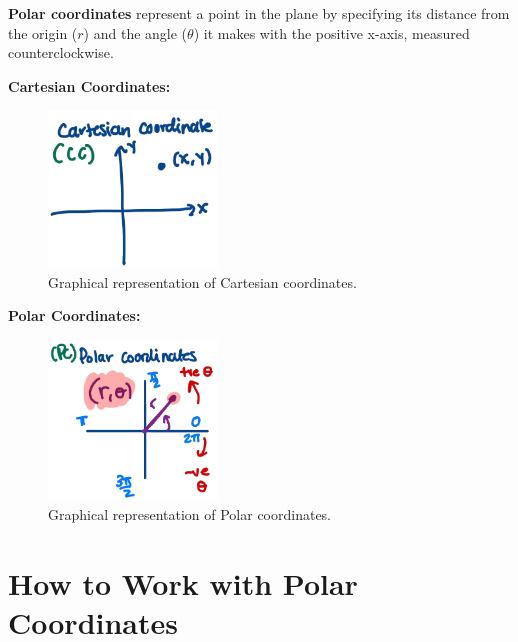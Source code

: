 \documentclass{article}
\begin{document}
\begin{definitionbox}
\textbf{Polar coordinates} represent a point in the plane by specifying its distance from the origin (\( r \)) and the angle (\( \theta \)) it makes with the positive x-axis, measured counterclockwise.

\vspace{0.5em}

\begin{conceptbox}
    \textbf{Cartesian Coordinates:}
    \begin{figure}[H]
        \centering
        \includegraphics[width=0.4\textwidth]{cartesian.png}
        \caption{Graphical representation of Cartesian coordinates.}
        \label{fig:cartesian_coordinates}
    \end{figure}
    
    \textbf{Polar Coordinates:}
    \begin{figure}[H]
        \centering
        \includegraphics[width=0.4\textwidth]{polar.png}
        \caption{Graphical representation of Polar coordinates.}
        \label{fig:polar_coordinates}
    \end{figure}
\end{conceptbox}
\end{definitionbox}

\section*{How to Work with Polar Coordinates}
\end{document}
